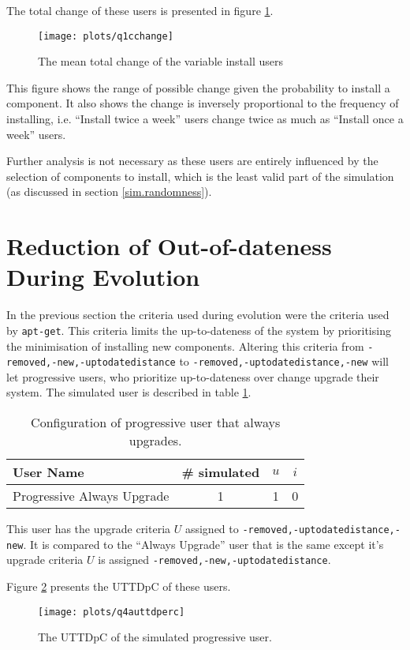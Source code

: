 The total change of these users is presented in figure \ref{exp.q1cchange}.
\begin{figure}[htp]
\begin{center}
  \texttt{[image: plots/q1cchange]}
  \caption{The mean total change of the variable install users}
  \label{exp.q1cchange}
\end{center}
\end{figure}
This figure shows the range of possible change given the probability to install a component.
It also shows the change is inversely proportional to the frequency of installing, 
i.e. ``Install twice a week'' users change twice as much as ``Install once a week'' users.

Further analysis is not necessary as these users are entirely influenced by the selection of components to install, which is the least valid part of the simulation (as discussed in section \ref{sim.randomness}).

\section{Reduction of Out-of-dateness During Evolution}
\label{exp.q2}
\label{exp.prouttdsection}
In the previous section the criteria used during evolution were the criteria used by \texttt{apt-get}.
This criteria limits the up-to-dateness of the system by prioritising the minimisation of installing new components.
Altering this criteria from \texttt{-removed,-new,-uptodatedistance} to \texttt{-removed,-uptodatedistance,-new} 
will let progressive users, who prioritize up-to-dateness over change upgrade their system.
The simulated user is described in table \ref{exp.tblq4ausers}.
\begin{table}[h!]
\centering
\begin{tabular}{|l | c | c | c |}
\hline
User Name 								& \# simulated 			& $u$ 		& $i$ 			\\ \hline
Progressive Always Upgrade				& 1 			 	& 1				& 0\\ \hline
\end{tabular}
\caption{Configuration of progressive user that always upgrades.}
\label{exp.tblq4ausers}
\end{table}
This user has the upgrade criteria $U$ assigned to \texttt{-removed,-uptodatedistance,-new}.
It is compared to the ``Always Upgrade'' user that is the same except it's upgrade criteria $U$ is assigned \texttt{-removed,-new,-uptodatedistance}.

Figure \ref{exp.q4auttdperc} presents the UTTDpC of these users.
\begin{figure}[htp]
\begin{center}
  \texttt{[image: plots/q4auttdperc]}
  \caption{The UTTDpC of the simulated progressive user.}
  \label{exp.q4auttdperc}
\end{center}
\end{figure}

